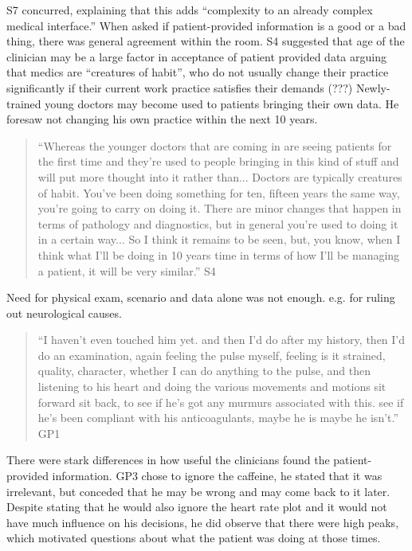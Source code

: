 \documentclass{sigchi}
\begin{document}
S7 concurred, explaining that this adds ``complexity to an already complex medical interface.'' When asked if patient-provided information is a good or a bad thing, there was general agreement within the room. S4 suggested that age of the clinician may be a large factor in acceptance of patient provided data arguing that medics are ``creatures of habit'', who do not usually change their practice significantly if their current work practice satisfies their demands (???)   Newly-trained young doctors may become used to patients bringing their own data. He foresaw not changing his own practice within the next 10 years.

\begin{quote}
    ``Whereas the younger doctors that are coming in are seeing patients for the first time and they're used to people bringing in this kind of stuff and will put more thought into it rather than... Doctors are typically creatures of habit. You've been doing something for ten, fifteen years the same way, you're going to carry on doing it. There are minor changes that happen in terms of pathology and diagnostics, but in general you're used to doing it in a certain way... So I think it remains to be seen, but, you know, when I think what I'll be doing in 10 years time in terms of how I'll be managing a patient, it will be very similar.'' S4
\end{quote}

Need for physical exam, scenario and data alone was not enough. e.g. for ruling out neurological causes.

\begin{quote}
    ``I haven't even touched him yet. and then I'd do after my history, then I'd do an examination, again feeling the pulse myself, feeling is it strained, quality, character, whether I can do anything to the pulse, and then listening to his heart and doing the various movements and motions sit forward sit back, to see if he's got any murmurs associated with this. see if he's been compliant with his anticoagulants, maybe he is maybe he isn't.'' GP1
\end{quote}


There were stark differences in how useful the clinicians found the patient-provided information. GP3 chose to ignore the caffeine, he stated that it was irrelevant, but conceded that he may be wrong and may come back to it later. Despite stating that he would also ignore the heart rate plot and it would not have much influence on his decisions, he did observe that there were high peaks, which motivated questions about what the patient was doing at those times. 
\end{document}
